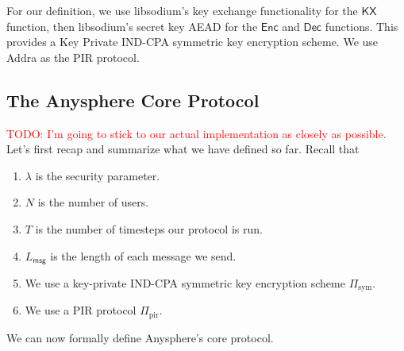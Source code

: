 \documentclass[sigconf, nonacm, balance=false, natbib=false, screen]{acmart}
\newcommand{\enc}{\mathsf{Enc}}
\newcommand{\dec}{\mathsf{Dec}}
\newcommand\todo[1]{\textcolor{red}{TODO: #1}}
\newcommand{\msg}{\mathsf{msg}}
\newcommand{\sym}{\text{sym}}
\newcommand{\pir}{\text{pir}}
\begin{document}
For our definition, we use libsodium's key exchange functionality for the $\mathsf{KX}$ function, then libsodium's secret key AEAD for the $\enc$ and $\dec$ functions. This provides a Key Private IND-CPA symmetric key encryption scheme. We use Addra as the PIR protocol.
\subsection{The Anysphere Core Protocol}
\todo{I'm going to stick to our actual implementation as closely as possible.}
Let's first recap and summarize what we have defined so far. Recall that
\begin{enumerate}
    \item $\lambda$ is the security parameter.
    \item $N$ is the number of users.
    \item $T$ is the number of timesteps our protocol is run.
    \item $L_{\msg}$ is the length of each message we send.
    \item We use a key-private IND-CPA symmetric key encryption scheme $\Pi_{\sym}$.
    \item We use a PIR protocol $\Pi_{\pir}$.
\end{enumerate}
We can now formally define Anysphere's core protocol.
\newcommand{\frienddb}{\mathsf{frdb}}
\newcommand{\inb}{\mathsf{in}}
\newcommand{\outb}{\mathsf{out}}
\newcommand{\msgdb}{\mathsf{msgdb}}
\newcommand{\trans}{\mathsf{trans}}
\end{document}
